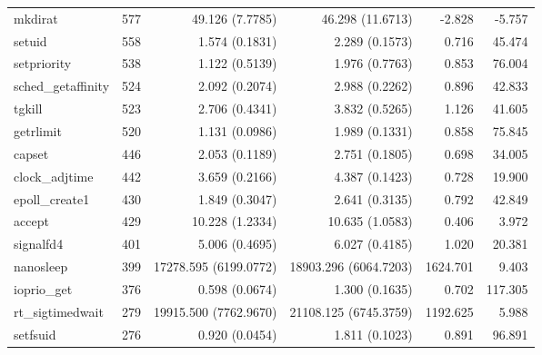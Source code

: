 \begin{longtable}{>{\ttfamily}lrrrrr}
                        mkdirat &        577 &             49.126 (7.7785) &          46.298 (11.6713) &          -2.828 &       -5.757 \\
                         setuid &        558 &              1.574 (0.1831) &            2.289 (0.1573) &           0.716 &       45.474 \\
                    setpriority &        538 &              1.122 (0.5139) &            1.976 (0.7763) &           0.853 &       76.004 \\
             sched\_getaffinity &        524 &              2.092 (0.2074) &            2.988 (0.2262) &           0.896 &       42.833 \\
                         tgkill &        523 &              2.706 (0.4341) &            3.832 (0.5265) &           1.126 &       41.605 \\
                      getrlimit &        520 &              1.131 (0.0986) &            1.989 (0.1331) &           0.858 &       75.845 \\
                         capset &        446 &              2.053 (0.1189) &            2.751 (0.1805) &           0.698 &       34.005 \\
                 clock\_adjtime &        442 &              3.659 (0.2166) &            4.387 (0.1423) &           0.728 &       19.900 \\
                 epoll\_create1 &        430 &              1.849 (0.3047) &            2.641 (0.3135) &           0.792 &       42.849 \\
                         accept &        429 &             10.228 (1.2334) &           10.635 (1.0583) &           0.406 &        3.972 \\
                      signalfd4 &        401 &              5.006 (0.4695) &            6.027 (0.4185) &           1.020 &       20.381 \\
                      nanosleep &        399 &       17278.595 (6199.0772) &     18903.296 (6064.7203) &        1624.701 &        9.403 \\
                    ioprio\_get &        376 &              0.598 (0.0674) &            1.300 (0.1635) &           0.702 &      117.305 \\
               rt\_sigtimedwait &        279 &       19915.500 (7762.9670) &     21108.125 (6745.3759) &        1192.625 &        5.988 \\
                       setfsuid &        276 &              0.920 (0.0454) &            1.811 (0.1023) &           0.891 &       96.891 \\

\end{longtable}
